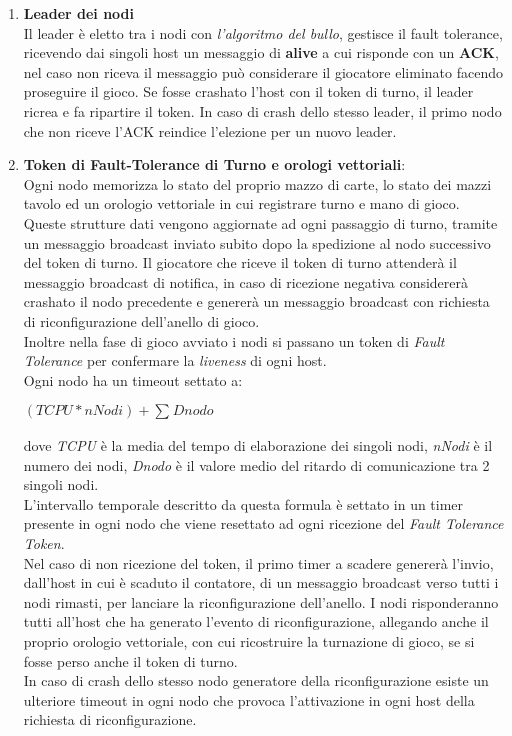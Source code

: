 \documentclass[10pt,a4paper]{article}
\begin{document}
\begin{enumerate}
\item \textbf{Leader dei nodi}\\ Il leader è eletto tra i nodi con \textit{l'algoritmo del bullo}, gestisce il fault tolerance, ricevendo dai singoli host un messaggio di \textbf{alive} a cui risponde con un \textbf{ACK}, nel caso non riceva il messaggio può considerare il giocatore eliminato facendo proseguire il gioco. Se fosse crashato l'host con il token di turno, il leader ricrea e fa ripartire il token. In caso di crash dello stesso leader, il primo nodo che non riceve l'ACK reindice l'elezione per un nuovo leader. 

\item \textbf{Token di Fault-Tolerance di Turno e orologi vettoriali}:\\ Ogni nodo memorizza lo stato del proprio mazzo di carte, lo stato dei mazzi tavolo ed un orologio vettoriale in cui registrare turno e mano di gioco. Queste strutture dati vengono aggiornate ad ogni passaggio di turno, tramite un messaggio broadcast inviato subito dopo la spedizione al nodo successivo del token di turno. Il giocatore che riceve il token di turno attenderà il messaggio broadcast di notifica, in caso di ricezione negativa considererà crashato il nodo precedente e genererà un messaggio broadcast con richiesta di riconfigurazione dell'anello di gioco.\\Inoltre nella fase di gioco avviato i nodi si passano un token di \textit{Fault Tolerance} per confermare la \textit{liveness} di ogni host. \\ Ogni nodo ha un timeout settato a: \\\begin{center}$(TCPU*nNodi)+\sum_{}Dnodo$\end{center} dove \textit{TCPU} è la media del tempo di elaborazione dei singoli nodi, \textit{nNodi} è il numero dei nodi, \textit{Dnodo} è il valore medio del ritardo di comunicazione tra 2 singoli nodi.\\L'intervallo temporale descritto da questa formula è settato in un timer presente in ogni nodo che viene resettato ad ogni ricezione del \textit{Fault Tolerance Token}.\\ Nel caso di non ricezione del token, il primo timer a scadere genererà l'invio, dall'host in cui è scaduto il contatore, di un messaggio broadcast verso tutti i nodi rimasti, per lanciare la riconfigurazione dell'anello. I nodi risponderanno tutti all'host che ha generato l'evento di riconfigurazione, allegando anche il proprio orologio vettoriale, con cui ricostruire la turnazione di gioco, se si fosse perso anche il token di turno. \\ In caso di crash dello stesso nodo generatore della riconfigurazione esiste un ulteriore timeout in ogni nodo che provoca l'attivazione in ogni host della richiesta di riconfigurazione.\end{enumerate}
\end{document}
